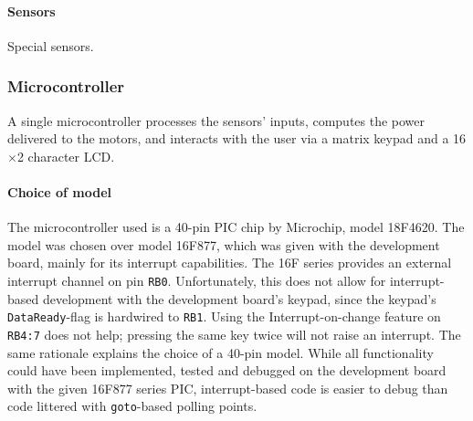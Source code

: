\documentclass[11pt]{report}
\begin{document}
\paragraph{Sensors}
Special sensors.
\subsubsection{Microcontroller}
A single microcontroller processes the sensors' inputs, computes the power delivered to the motors, and interacts with the user via a matrix keypad and a 16$\times$2 character LCD. 
\paragraph{Choice of model}
The microcontroller used is a 40-pin PIC chip by Microchip, model 18F4620. The model was chosen over model 16F877, which was given with the development board, mainly for its interrupt capabilities. The 16F series provides an external interrupt channel on pin \texttt{RB0}. Unfortunately, this does not allow for interrupt-based development with the development board's keypad, since the keypad's \texttt{DataReady}-flag is hardwired to \texttt{RB1}. Using the Interrupt-on-change feature on \texttt{RB4:7} does not help; pressing the same key twice will not raise an interrupt. The same rationale explains the choice of a 40-pin model. While all functionality could have been implemented, tested and debugged on the development board with the given 16F877 series PIC, interrupt-based code is easier to debug than code littered with \texttt{goto}-based polling points.  
\end{document}
